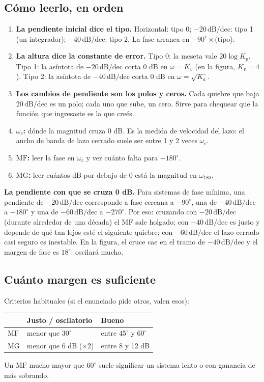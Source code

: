 \documentclass[11pt,a4paper]{article}
\newcommand{\dBdec}{\,\mathrm{dB/dec}}
\newcommand{\wc}{\omega_c}
\newcommand{\wcien}{\omega_{180}}
\newcommand{\MF}{\mathrm{MF}}
\newcommand{\MG}{\mathrm{MG}}
\begin{document}
\subsection{Cómo leerlo, en orden}
\begin{enumerate}
\item \textbf{La pendiente inicial dice el tipo.} Horizontal: tipo 0; $-20\dBdec$: tipo 1 (un integrador);
 $-40\dBdec$: tipo 2. La fase arranca en $-90^\circ\times$(tipo).
\item \textbf{La altura dice la constante de error.} Tipo 0: la meseta vale $20\log K_p$. Tipo 1: la asíntota de
 $-20\dBdec$ corta 0 dB en $\omega=K_v$ (en la figura, $K_v=4$). Tipo 2: la asíntota de $-40\dBdec$ corta 0 dB en
 $\omega=\sqrt{K_a}$.
\item \textbf{Los cambios de pendiente son los polos y ceros.} Cada quiebre que baja $20\dBdec$ es un polo; cada uno
 que sube, un cero. Sirve para chequear que la función que ingresaste es la que creés.
\item \textbf{$\wc$:} dónde la magnitud cruza 0 dB. Es la medida de velocidad del lazo: el ancho de banda de lazo cerrado
 suele ser entre 1 y 2 veces $\wc$.
\item \textbf{$\MF$:} leer la fase en $\wc$ y ver cuánto falta para $-180^\circ$.
\item \textbf{$\MG$:} leer cuántos dB por debajo de 0 está la magnitud en $\wcien$.
\end{enumerate}

\begin{regla}
\textbf{La pendiente con que se cruza 0 dB.} Para sistemas de fase mínima, una pendiente de $-20\dBdec$ corresponde a
fase cercana a $-90^\circ$, una de $-40\dBdec$ a $-180^\circ$ y una de $-60\dBdec$ a $-270^\circ$. Por eso:
cruzando con $-20\dBdec$ (durante alrededor de una década) el $\MF$ sale holgado; con $-40\dBdec$ es justo y depende de
qué tan lejos esté el siguiente quiebre; con $-60\dBdec$ el lazo cerrado casi seguro es inestable. En la figura, el cruce
cae en el tramo de $-40\dBdec$ y el margen de fase es $18^\circ$: oscilará mucho.
\end{regla}

\subsection{Cuánto margen es suficiente}
Criterios habituales (si el enunciado pide otros, valen esos):
\begin{center}
\small
\begin{tabular}{@{}lll@{}}
\toprule
& Justo / oscilatorio & Bueno \\
\midrule
$\MF$ & menor que $30^\circ$ & entre $45^\circ$ y $60^\circ$ \\
$\MG$ & menor que 6 dB ($\times2$) & entre 8 y 12 dB \\
\bottomrule
\end{tabular}
\end{center}
Un $\MF$ mucho mayor que $60^\circ$ suele significar un sistema lento o con ganancia de más sobrando.
\end{document}
